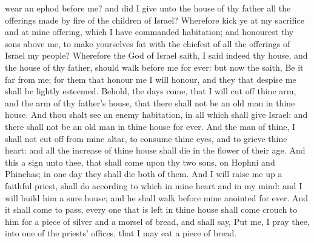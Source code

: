 {wear an
ephod
before me? and did I
give unto the
house of thy
father all the offerings made by
fire of the
children of
Israel?
Wherefore
kick ye at my
sacrifice and at mine
offering, which I have
commanded
{}
habitation; and
honourest thy
sons above me, to make yourselves
fat with the
chiefest of all the
offerings of
Israel my
people?
Wherefore the
{}
God of
Israel
saith, I
said
indeed
{} thy
house, and the
house of thy
father, should
walk
before me
for
ever: but now the
{}
saith, Be it far from
me; for them that
honour me I will
honour, and they that
despise me shall be lightly
esteemed.
Behold, the
days
come, that I will cut
off thine
arm, and the
arm of thy
father’s
house, that there shall not be an old
man in thine
house.
And thou shalt
see an
enemy
{}
habitation, in all
{} which
{} shall
give
Israel: and there shall not be an old
man in thine
house for
ever.
And the
man of thine,
{} I shall not cut
off from mine
altar,
{} to
consume thine
eyes, and to
grieve thine
heart: and all the
increase of thine
house shall
die in the flower of their
age.
And this
{} a
sign unto thee, that shall
come upon thy
two
sons, on
Hophni and
Phinehas; in
one
day they shall
die
both of them.
And I will raise me
up a
faithful
priest,
{} shall
do according to
{} which
{} in mine
heart and in my
mind: and I will
build him a
sure
house; and he shall
walk
before mine
anointed for
ever.
And it shall come to pass,
{} every one that is
left in thine
house shall
come
{}
crouch to him for a
piece of
silver and a
morsel of
bread, and shall
say,
Put me, I pray thee, into
one of the
priests’ offices, that I may
eat a
piece of
bread.

}
